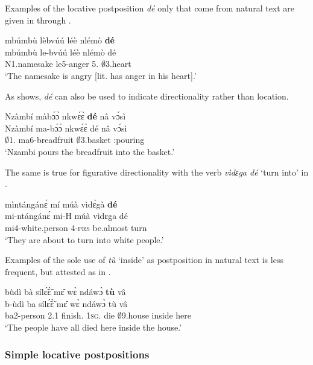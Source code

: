 Examples of the locative postposition {\itshape dé} only that come from natural text are given in  through .

\ea \label{deonly1}
  \glll mbúmbù lèbvúú léè nlémò {\bfseries dé} \\
         mbúmbù le-bvúú léè nlémò dé \\
        N1.namesake le5-anger 5.{\COP} $\emptyset$3.heart {\LOC}  \\
    \trans `The namesake is angry [lit. has anger in his heart].'
\z

\noindent As  shows, {\itshape dé} can also be used to indicate directionality rather than location.

\ea \label{deonly2}
  \glll Nzàmbí màbɔ́ɔ̀ nkwɛ́ɛ̀ {\bfseries dé} nâ vɔ́sì \\
        Nzàmbí ma-bɔ́ɔ̀ nkwɛ́ɛ̀ dé nâ vɔ́sì \\
          $\emptyset$1.{\PN} ma6-breadfruit $\emptyset$3.basket {\LOC} {\COMP} {\IDEO}:pouring\\
    \trans `Nzambi pours the breadfruit into the basket.'
\z

\noindent The same is true for figurative directionality with the verb {\itshape vìdɛga dé} `turn into' in .

\ea \label{deonly3}
  \glll mìntángánɛ́ mí múà vìdɛ̀gà {\bfseries dé} \\
       mi-ntángánɛ́ mi-H múà vìdɛga dé \\
       mi4-white.person 4-\textsc{prs} be.almost turn {\LOC}  \\
    \trans `They are about to turn into white people.'
\z


Examples of the sole use of {\itshape tù} `inside' as postposition in natural text is less frequent, but attested as in .

\ea \label{tuonly}
  \glll bùdì bà sílɛ̃́ɛ̃̀ mɛ̂ wɛ̀ ndáwɔ̀ {\bfseries tù} vâ \\
        b-ùdì ba sílɛ̃́ɛ̃̀ mɛ̂ wɛ̀ ndáwɔ̀ tù vâ \\
       ba2-person 2.{\PST}1 finish.{\COMPL} 1\textsc{sg}.{\OBJ} die $\emptyset$9.house inside here  \\
    \trans `The people have all died here inside the house.'
\z




\subsubsection{Simple locative postpositions}
\label{sec:LOCgen}

